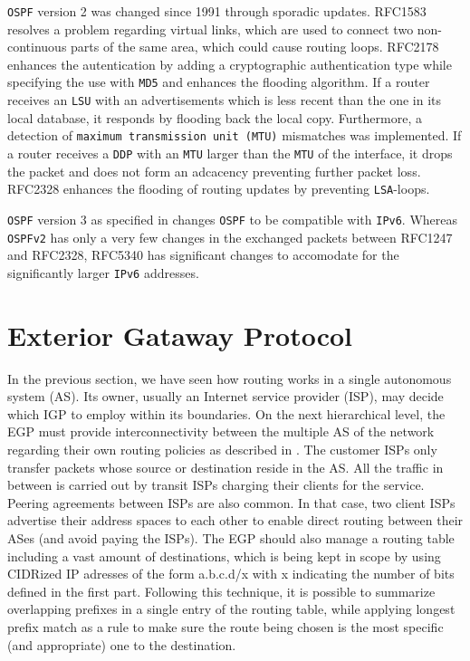 \documentclass{acm_proc_article-sp}
\begin{document}
\texttt{OSPF} version 2 was changed since 1991 through sporadic updates. RFC1583 \cite{RFC1583} resolves a problem regarding virtual links, which are used to connect two non-continuous parts of the same area, which could cause routing loops. RFC2178 \cite{RFC2178} enhances the autentication by adding a cryptographic authentication type while specifying the use with \texttt{MD5} and enhances the flooding algorithm. If a router receives an \texttt{LSU} with an advertisements which is less recent than the one in its local database, it responds by flooding back the local copy. Furthermore, a detection of \texttt{maximum transmission unit (MTU)} mismatches was implemented. If a router receives a \texttt{DDP} with an \texttt{MTU} larger than the \texttt{MTU} of the interface, it drops the packet and does not form an adcacency preventing further packet loss. RFC2328 enhances the flooding of routing updates by preventing \texttt{LSA}-loops.

\texttt{OSPF} version 3 as specified in \cite{RFC5340} changes \texttt{OSPF} to be compatible with \texttt{IPv6}. Whereas \texttt{OSPFv2} has only a very few changes in the exchanged packets between RFC1247 and RFC2328, RFC5340 has significant changes to accomodate for the significantly larger \texttt{IPv6} addresses.

\section{Exterior Gataway Protocol}

In the previous section, we have seen how routing works in a single autonomous system (AS). Its owner, usually an Internet service provider (ISP), may decide which IGP to employ within its boundaries. On the next hierarchical level, the EGP must provide interconnectivity between the multiple AS of the network regarding their own routing policies as described in \cite{tanenbaum}. The customer ISPs only transfer packets whose source or destination reside in the AS. All the traffic in between is carried out by transit ISPs charging their clients for the service. Peering agreements between ISPs are also common. In that case, two client ISPs advertise their address spaces to each other to enable direct routing between their ASes (and avoid paying the ISPs). The EGP should also manage a routing table including a vast amount of destinations, which is being kept in scope by using CIDRized IP adresses of the form a.b.c.d/x with x indicating the number of bits defined in the first part. Following this technique, it is possible to summarize overlapping prefixes in a single entry of the routing table, while applying longest prefix match as a rule to make sure the route being chosen is the most specific (and appropriate) one to the destination.
\end{document}
